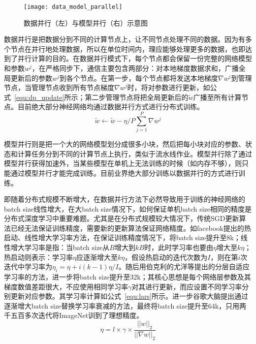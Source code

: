\begin{figure}[htp]
\centering
\texttt{[image: data\_model\_parallel]}
\caption{数据并行（左）与模型并行（右）示意图}
\label{fig:data_model_parallel}
\end{figure}
数据并行是把数据分到不同的计算节点上，让不同节点处理不同的数据。因为有多个节点在并行地处理数据，所以在单位时间内，理应能够处理更多的数据，也即达到了并行计算的目的。在数据并行模式下，每个节点都会保留一份完整的网络模型和参数$w^{j}$，在严格同步下，通信主要包含两部分：对本地梯度数据求和，广播全局更新后的参数$w^{j}$到各个节点。在第一步，每个节点都将发送本地梯度$\nabla w^{j}$到管理节点，当管理节点收到所有节点梯度$\nabla w^{j}$时，将对参数进行更新，如公式~\ref{equ:dp_update}所示；第二步管理节点将把全局更新后的$\widetilde w$广播至所有计算节点。目前绝大部分神经网络均通过数据并行方式进行分布式训练。
\begin{equation}
\label{equ:dp_update}
\widetilde w \leftarrow \widetilde w - \eta /P \sum^{P}_{j=1}\nabla w^{j}
\end{equation}


模型并行则是把一个大的网络模型划分成很多小块，然后把每小块对应的参数、状态和计算任务分到不同的计算节点上执行，类似于流水线作业。模型并行除了通过模型并行获得加速外，当某些模型在单机上无法训练的时候（如内存不够），则只能通过模型并行才能完成训练。目前业界绝大部分训练以数据并行的方式进行训练。

即随着分布式规模不断增大，在数据并行方法下必然导致用于训练的神经网络的batch size线性增大，在大batch size情况下，如何保证单机batch size相同的精度是分布式深度学习中重要难题。尤其是在分布式规模较大情况下，传统SGD更新算法已经无法保证训练精度，需要新的更新算法保证网络精度。如facebook提出的热启动、线性增大学习率方法，在保证训练精度情况下，将batch size提升至8k；线性增大学习率是指：当batch size从$B$增大到$kB$时，此时学习率也要由$\eta$增大至$k\eta$；热启动则表示：学习率$\eta$应逐渐增大至$k\eta$，假设热启动的迭代次数为$I$，则在第$i$次迭代中学习率为$\eta _{i}=\eta + i(k-1)\eta/I$。随后用伯克利的尤洋等提出的分层自适应学习率的方法，进一步将batch size提升至32k；其核心思想是每个网络层参数及其梯度数值差距很大，不应使用相同学习率$\gamma$对其进行更新，而应设置不同学习率分别更新对应参数。其学习率计算如公式~\ref{equ:lars}所示。进一步谷歌大脑提出通过逐渐增大batch size替换学习率衰减的方法，最终将batch size提升至64k，只用两千五百多次迭代将ImageNet训到了理想精度。
\begin{equation}
\eta = l \times \gamma \times \frac{||w||_{2}}{||\nabla w||_{2}}
\label{equ:lars}
\end{equation}

